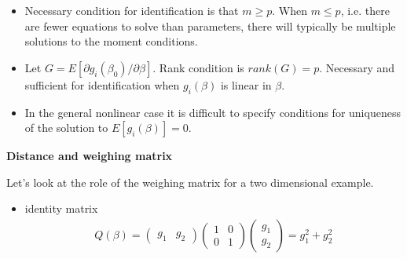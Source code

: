 \begin{frame}

\begin{itemize}
\item Necessary condition for identification is that $m \geq p$. When $m \leq p$, i.e. there are fewer equations to solve than parameters, there will
typically be multiple solutions to the moment conditions.
\end{itemize}

\end{frame}
\begin{frame}

\begin{itemize}\setlength\itemsep{1em}
\item Let $G = E[\partial g_i(\beta_0) / \partial \beta]$. Rank condition is $rank(G) = p$. Necessary and sufficient for identification when $g_i(\beta)$ is linear in $\beta$.
\item In the general nonlinear case it is difficult to specify conditions for uniqueness of the solution to $E[g_i(\beta)] = 0$.
\end{itemize}

\end{frame}
\begin{frame}\textbf{Distance and weighing matrix}\vspace{0.3cm}

Let's look at the role of the weighing matrix for a two dimensional example.\vspace{0.3cm}

\begin{itemize}
\item identity matrix
\begin{align*}Q(\beta) =
\left(\begin{matrix}
g_1 & g_2
\end{matrix}\right)
\left(\begin{matrix}
1 & 0 \\
0 & 1
\end{matrix}\right)
\left(\begin{matrix}
g_1 \\
g_2
\end{matrix}\right) = g_1^2 + g_2^2
\end{align*}
\end{itemize}
\end{frame}
